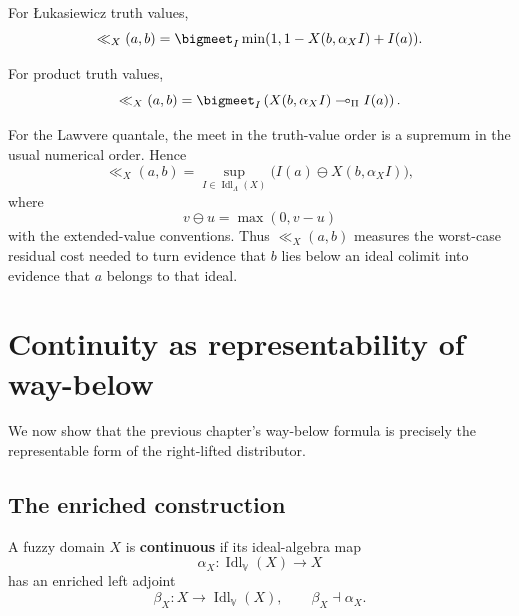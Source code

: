 \begin{example}
\label{ex:fuzzy-way-below-lukasiewicz}
For {\L}ukasiewicz truth values,
\[
    \ll_X(a,b)
    =
    \bigmeet_{I}
    \min(1,1-X(b,\alpha_X I)+I(a)).
\]
\end{example}

\begin{example}
\label{ex:fuzzy-way-below-product}
For product truth values,
\[
    \ll_X(a,b)
    =
    \bigmeet_I
    \left(
        X(b,\alpha_X I)\multimap_\Pi I(a)
    \right).
\]
\end{example}

\begin{example}
\label{ex:fuzzy-way-below-lawvere}
For the Lawvere quantale, the meet in the truth-value order is a supremum in the
usual numerical order. Hence
\[
    \ll_X(a,b)
    =
    \sup_{I\in\operatorname{Idl}_\Lambda(X)}
    \bigl(I(a)\ominus X(b,\alpha_X I)\bigr),
\]
where
\[
    v\ominus u=\max(0,v-u)
\]
with the extended-value conventions. Thus \(\ll_X(a,b)\) measures the
worst-case residual cost needed to turn evidence that \(b\) lies below an ideal
colimit into evidence that \(a\) belongs to that ideal.
\end{example}

\section{Continuity as representability of way-below}
\label{sec:continuity-representability-way-below}

We now show that the previous chapter's way-below formula is precisely the
representable form of the right-lifted distributor.

\subsection{The enriched construction}
\label{subsec:continuity-representability-enriched}

\begin{definition}
\label{def:continuous-fuzzy-domain-recalled-equipment}
A fuzzy domain \(X\) is \textbf{continuous} if its ideal-algebra map
\[
    \alpha_X:\operatorname{Idl}_{\mathbb V}(X)\to X
\]
has an enriched left adjoint
\[
    \beta_X:X\to\operatorname{Idl}_{\mathbb V}(X),
    \qquad
    \beta_X\dashv\alpha_X.
\]
\end{definition}


